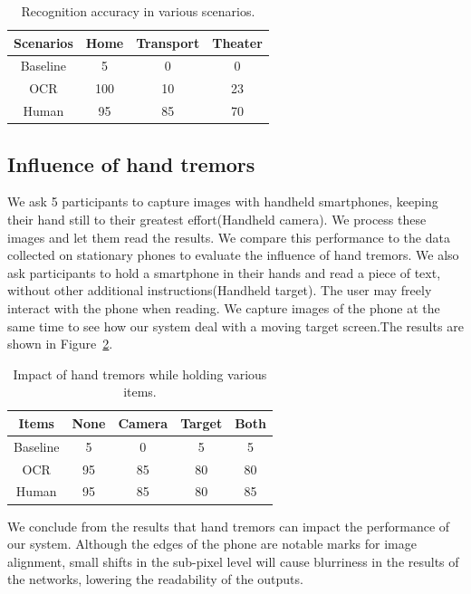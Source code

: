 \begin{table}[!t]
    \centering
    \begin{tabular}{@{}cccc@{}}
        \toprule
    Scenarios & Home & Transport & Theater \\ \midrule
    Baseline & 5 & 0 & 0\\ 
    \midrule
    OCR & 100 & 10 & 23\\ 
    Human & 95 & 85 & 70\\ \bottomrule
    \end{tabular}
    \caption{Recognition accuracy in various scenarios.}
    \label{table-scenarios}
\end{table}

\subsection{Influence of hand tremors}
We ask 5 participants to capture images with handheld smartphones, keeping their hand still to their greatest effort(Handheld camera). We process these images and let them read the results. We compare this performance to the data collected on stationary phones to evaluate the influence of hand tremors.
We also ask participants to hold a smartphone in their hands and read a piece of text, without other additional instructions(Handheld target). The user may freely interact with the phone when reading. We capture images of the phone at the same time to see how our system deal with a moving target screen.The results are shown in Figure~\ref{table-tremor}.

\begin{table}[!t] 
    \centering
    \begin{tabular}{ccccc}
        \toprule
    Items & None & Camera & Target & Both  \\
    \midrule
    Baseline & 5 & 0 & 5& 5\\ 
    \midrule
    OCR & 95 & 85 & 80 & 80\\ 
    Human & 95 & 85 & 80 & 85\\ \bottomrule
    \end{tabular}
    \caption{Impact of hand tremors while holding various items.}
    \label{table-tremor}
\end{table}

We conclude from the results that hand tremors can impact the performance of our system. Although the edges of the phone are notable marks for image alignment, small shifts in the sub-pixel level will cause blurriness in the results of the networks, lowering the readability of the outputs. 

